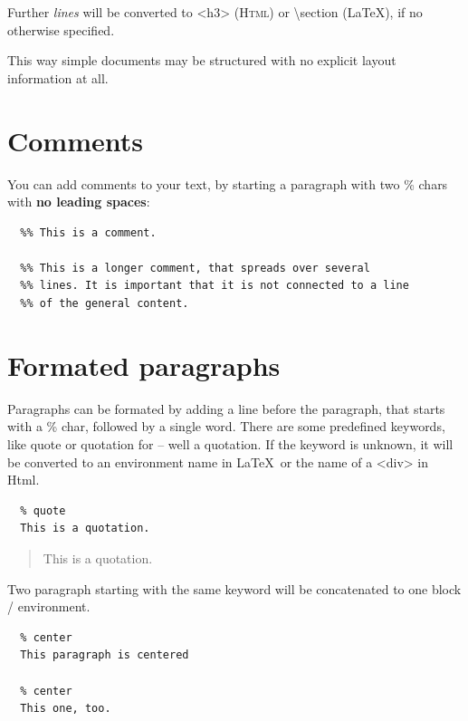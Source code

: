 \documentclass{article}
\begin{document}
{Further \emph{lines} will be converted to <h3> (\textsc{Html}) or \textbackslash section
(LaTeX), if no otherwise specified.\\}

{This way simple documents may be structured with no explicit
layout information at all.\\}

\section{Comments}

{You can add comments to your text, by starting a paragraph
with two \% chars with \textbf{no leading spaces}:\\}

\begin{verbatim}
  %% This is a comment.

  %% This is a longer comment, that spreads over several
  %% lines. It is important that it is not connected to a line
  %% of the general content.
\end{verbatim}


\section{Formated paragraphs}

{Paragraphs can be formated by adding a line before the
paragraph, that starts with a \% char, followed by a single
word. There are some predefined keywords, like quote or
quotation for – well a quotation.
If the keyword is unknown, it will be converted to an environment
name in \LaTeX\  or the name of a <div> in Html.\\}

\begin{verbatim}
  % quote
  This is a quotation.
\end{verbatim}


\begin{quote}
This is a quotation.
\end{quote}


{Two paragraph starting with the same keyword will be
concatenated to one block / environment.\\}

\begin{verbatim}
  % center
  This paragraph is centered

  % center
  This one, too.
\end{verbatim}
\end{document}
